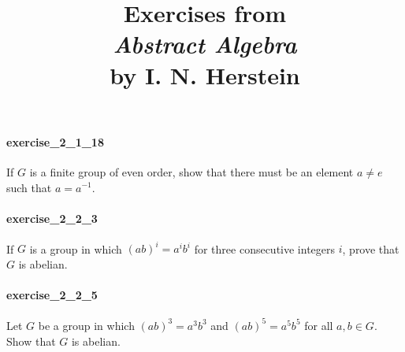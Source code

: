 \documentclass{article}
\title{\textbf{
Exercises from \\
\textit{Abstract Algebra} \\
by I. N. Herstein
}}
\date{}
\begin{document}
\maketitle

\paragraph{exercise\_2\_1\_18} If $G$ is a finite group of even order, show that there must be an element $a \neq e$ such that $a=a^{-1}$.

\paragraph{exercise\_2\_2\_3} If $G$ is a group in which $(a b)^{i}=a^{i} b^{i}$ for three consecutive integers $i$, prove that $G$ is abelian.

\paragraph{exercise\_2\_2\_5} Let $G$ be a group in which $(a b)^{3}=a^{3} b^{3}$ and $(a b)^{5}=a^{5} b^{5}$ for all $a, b \in G$. Show that $G$ is abelian.
\end{document}
